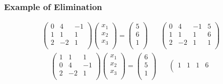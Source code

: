 \documentclass[10pt]{beamer}
\begin{document}
\begin{frame}
  \frametitle{Example of Elimination}
  \[
    \begin{array}{cc}
    \left(
      \begin{array}{rrr}
        0 &  4 & -1\\
        1 &  1 &  1\\
        2 & -2 &  1\\
      \end{array}
    \right)
    \left(
      \begin{array}{r}
        x_1 \\ x_2 \\ x_ 3 \\
      \end{array}
    \right) =
    \left(
      \begin{array}{r}
        5 \\ 6 \\ 1 \\
      \end{array}
    \right)
      & ~~~~
    \left(
      \begin{array}{rrr|r}
        0 &  4 & -1 & 5\\
        1 &  1 &  1 & 6\\
        2 & -2 &  1 & 1\\
      \end{array}
    \right)
    \end{array}
    \] \pause
    \[
    \begin{array}{cc}
    \left(
      \begin{array}{rrr}
        1 &  1 &  1\\
        0 &  4 & -1\\
        2 & -2 &  1\\
      \end{array}
    \right)
    \left(
      \begin{array}{r}
        x_1 \\ x_2 \\ x_ 3 \\
      \end{array}
    \right) =
    \left(
      \begin{array}{r}
        6 \\ 5 \\ 1 \\
      \end{array}
    \right)
      & ~~~~
    \left(
      \begin{array}{rrr|r}
        1 &  1 &  1 & 6\\

\end{array}
\end{array}\]
\end{frame}
\end{document}
